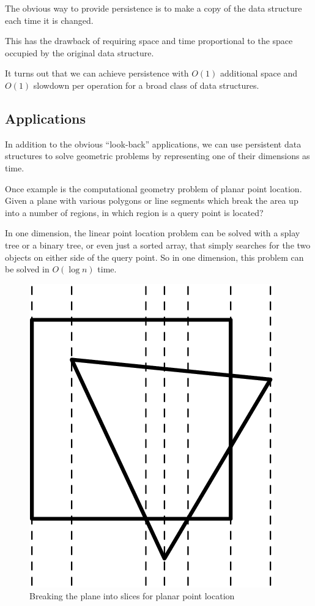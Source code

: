 \documentclass{article}
\begin{document}
The obvious way to provide persistence is to make a copy of the data structure each time it is changed.

This has the drawback of requiring space and time proportional to
the space occupied by the original data structure.

It turns out that we can achieve persistence with $O(1)$ additional
space and $O(1)$ slowdown per operation for a broad class of data
structures.

\subsection{Applications}

In addition to the obvious ``look-back'' applications, we can use
persistent data structures to solve geometric problems by representing
one of their dimensions as time.

Once example is the computational geometry problem of planar point
location. Given a plane with various polygons or line segments which
break the area up into a number of regions, in which region is a query
point is located?

In one dimension, the linear point location problem can be solved with
a splay tree or a binary tree, or even just a sorted array, that
simply searches for the two objects on either side of the query point.
So in one dimension, this problem can be solved in $O(\log n)$ time.

\begin{figure}[ht]
\begin{center}
  \includegraphics{scribe5fig.4.png}
\end{center}
\caption{Breaking the plane into slices for planar point location}
\label{fig:ppl}
\end{figure}
\end{document}
